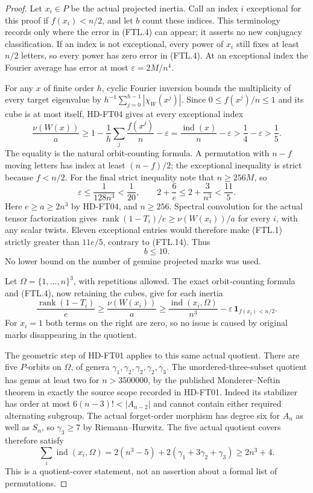 \begin{proof}
Let $x_i\in P$ be the actual projected inertia.  Call an index $i$
exceptional for this proof if $f(x_i)<n/2$, and let $b$ count these
indices.  This terminology records only where the error in (FTL.4)
can appear; it asserts no new conjugacy classification.
If an index is not exceptional, every power of $x_i$ still fixes
at least $n/2$ letters, so every power has zero error in (FTL.4).
At an exceptional index the Fourier average has error at most
$\varepsilon=2M/n^4$.

For any $x$ of finite order $h$, cyclic Fourier inversion bounds
the multiplicity of every target eigenvalue by
$h^{-1}\sum_{j=0}^{h-1}|\chi_W(x^j)|$.  Since $0\le f(x^j)/n\le1$
and its cube is at most itself, HD-FT04 gives at every exceptional index
\[
 \frac{\nu(W(x))}{a}
   \ge1-\frac1h\sum_j\frac{f(x^j)}n-\varepsilon
   =\frac{\operatorname{ind}(x)}n-\varepsilon
   >\frac14-\varepsilon>\frac15.
 \tag{FTL.13}
\]
The equality is the natural orbit-counting formula.  A permutation with
$n-f$ moving letters has index at least $(n-f)/2$; the exceptional
inequality is strict because $f<n/2$.
For the final strict inequality note that $n\ge256M$, so
\[
        \varepsilon\le\frac1{128n^3}<\frac1{20},
        \qquad
        2+\frac6e\le2+\frac3{n^3}<\frac{11}{5}.
 \tag{FTL.14}
\]
Here $e\ge a\ge2n^3$ by HD-FT04, and $n\ge256$.
Spectral convolution for the actual tensor factorization gives
$\operatorname{rank}(1-T_i)/e\ge\nu(W(x_i))/a$ for every $i$,
with any scalar twists.  Eleven exceptional entries would therefore
make (FTL.1) strictly greater than $11e/5$, contrary to (FTL.14).
Thus
\[
                              b\le10.
 \tag{FTL.15}
\]
No lower bound on the number of genuine projected marks was used.

Let $\Omega=\{1,\ldots,n\}^3$, with repetitions allowed.
The exact orbit-counting formula and (FTL.4), now retaining the cubes,
give for each inertia
\[
 \frac{\operatorname{rank}(1-T_i)}e
 \ge\frac{\nu(W(x_i))}{a}
 \ge\frac{\operatorname{ind}(x_i,\Omega)}{n^3}
                  -\varepsilon\,\mathbf1_{f(x_i)<n/2}.
 \tag{FTL.16}
\]
For $x_i=1$ both terms on the right are zero, so no issue is caused
by original marks disappearing in the quotient.

The geometric step of HD-FT01 applies to this same actual quotient.
There are five $P$-orbits on $\Omega$, of genera
$\gamma_1,\gamma_2,\gamma_2,\gamma_2,\gamma_3$.
The unordered-three-subset quotient has genus at least two for
$n>3500000$, by the published Monderer--Neftin theorem in exactly
the source scope recorded in HD-FT01.\cite[Theorem~1.2 and
Remark~2.8]{HD:MondererNeftin2022}
Indeed its stabilizer has order at most $6(n-3)!<|A_{n-2}|$ and
cannot contain either required alternating subgroup.
The actual forget-order morphism has degree six for $A_n$ as well as
$S_n$, so $\gamma_3\ge7$ by Riemann--Hurwitz.  The five actual
quotient covers therefore satisfy
\[
 \sum_i\operatorname{ind}(x_i,\Omega)
       =2(n^3-5)+2(\gamma_1+3\gamma_2+\gamma_3)
       \ge2n^3+4.
 \tag{FTL.17}
\]
This is a quotient-cover statement, not an assertion about a formal
list of permutations.


\end{proof}
